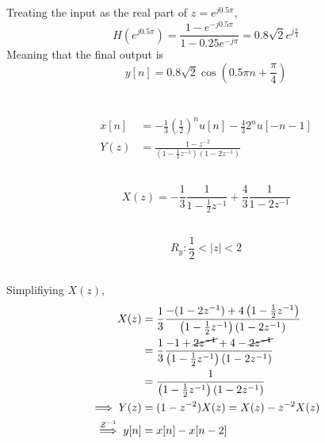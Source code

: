 \documentclass{article}
\begin{document}
\subsection{}

Treating the input as the real part of \(z = e^{j 0.5 \pi}\),
\begin{equation}
    H(e^{j 0.5 \pi}) = \frac{1 - e^{-j 0.5 \pi}}{1 - 0.25e^{-j\pi}} = 0.8 \sqrt{2} e^{j \frac{\pi}{4}}
\end{equation}
Meaning that the final output is
\begin{equation}
    y[n] = 0.8 \sqrt{2} \cos\left(0.5 \pi n + \frac{\pi}{4}\right)
\end{equation}

\newpage
\section{}

\begin{align}
    x[n] &= -\frac{1}{3} \left(\frac{1}{2}\right)^n u[n] - \frac{4}{3} 2^n u[-n - 1] \\
    Y(z) &= \frac{1 - z^{-2}}{\left(1 - \frac{1}{2} z^{-1}\right) (1 - 2z^{-1})}
\end{align}

\subsection{}

\begin{equation}
    X(z) = -\frac{1}{3} \frac{1}{1 - \frac{1}{2} z^{-1}} + \frac{4}{3} \frac{1}{1 - 2z^{-1}}
\end{equation}

\subsection{}

\begin{equation}
    R_y: \frac{1}{2} < |z| < 2
\end{equation}

\subsection{}

Simplifiying \(X(z)\),
\begin{align}
    X(z) &= \frac{1}{3} \frac{-(1 - 2z^{-1}) + 4 \left(1 - \frac{1}{2} z^{-1}\right)}{\left(1 - \frac{1}{2} z^{-1}\right) (1 - 2z^{-1})} \\
    &= \frac{1}{3} \frac{-1 + \cancel{2z^{-1}} + 4 - \cancel{2z^{-1}}}{\left(1 - \frac{1}{2} z^{-1}\right) (1 - 2z^{-1})} \\
    &= \frac{1}{\left(1 - \frac{1}{2} z^{-1}\right) (1 - 2z^{-1})} \\
    \implies Y(z) &= (1 - z^{-2}) X(z) = X(z) - z^{-2} X(z) \\
    \overset{\mathcal{Z}^{-1}}{\implies} y[n] &= x[n] - x[n - 2]
\end{align}
\end{document}
